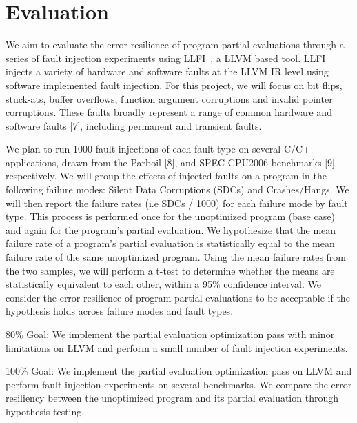 \section{Evaluation}

We aim to evaluate the error resilience of program partial evaluations through a series of fault injection experiments using LLFI~\cite{LLFI}, a LLVM based tool.
LLFI injects a variety of hardware and software faults at the LLVM IR level using software implemented fault injection.
For this project, we will focus on bit flips, stuck-ats, buffer overflows, function argument corruptions and invalid pointer corruptions.
These faults broadly represent a range of common hardware and software faults [7], including permanent and transient faults. 

We plan to run 1000 fault injections of each fault type on several C/C++ applications, drawn from the Parboil [8], and SPEC CPU2006 benchmarks [9] respectively.
We will group the effects of injected faults on a program in the following failure modes: Silent Data Corruptions (SDCs) and Crashes/Hangs.
We will then report the failure rates (i.e SDCs / 1000) for each failure mode by fault type.
This process is performed once for the unoptimized program (base case) and again for the program’s partial evaluation.
We hypothesize that the mean failure rate of a program’s partial evaluation is statistically equal to the mean failure rate of the same unoptimized program.
Using the mean failure rates from the two samples, we will perform a t-test to determine whether the means are statistically equivalent to each other, within a 95\% confidence interval.
We consider the error resilience of program partial evaluations to be acceptable if the hypothesis holds across failure modes and fault types. 

80\% Goal: We implement the partial evaluation optimization pass with minor limitations on LLVM and perform a small number of fault injection experiments.

100\% Goal: We implement the partial evaluation optimization pass on LLVM and perform fault injection experiments on several benchmarks. We compare the error resiliency between the unoptimized program and its partial evaluation through hypothesis testing. 
